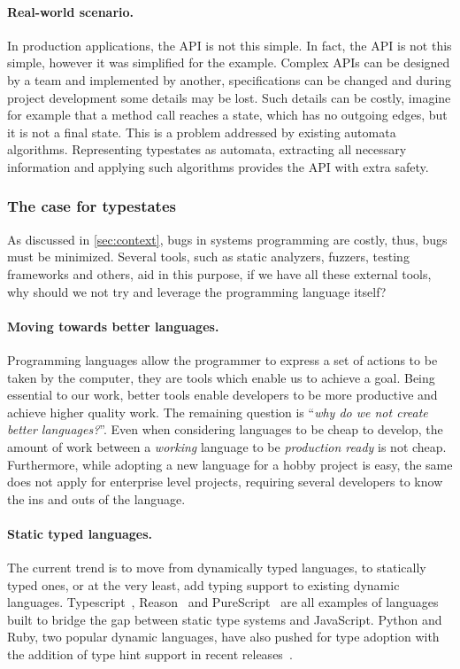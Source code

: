 \paragraph{Real-world scenario.}
In production applications, the API is not this simple.
In fact, the  API is not this simple, however it was simplified for the example.
Complex APIs can be designed by a team and implemented by another,
specifications can be changed and during project development some details may be lost.
Such details can be costly, imagine for example that a method call reaches a state, which has no outgoing edges,
but it is not a final state. This is a problem addressed by existing automata algorithms.
Representing typestates as automata, extracting all necessary information and applying such algorithms provides the API with extra safety.

\subsubsection*{The case for typestates}

As discussed in \autoref{sec:context}, bugs in systems programming are costly,
thus, bugs must be minimized.
Several tools, such as static analyzers, fuzzers, testing frameworks and others,
aid in this purpose, if we have all these external tools,
why should we not try and leverage the programming language itself?

\paragraph{Moving towards better languages.}
Programming languages allow the programmer to express a set of actions to be taken by the computer,
they are tools which enable us to achieve a goal.
Being essential to our work, better tools enable developers to be more productive and achieve higher quality work.
The remaining question is “\emph{why do we not create better languages?}”.
Even when considering languages to be cheap to develop,
the amount of work between a \emph{working} language to be \emph{production ready} is not cheap.
Furthermore, while adopting a new language for a hobby project is easy,
the same does not apply for enterprise level projects,
requiring several developers to know the ins and outs of the language.

\paragraph{Static typed languages.}
The current trend is to move from dynamically typed languages,
to statically typed ones, or at the very least, add typing support to existing dynamic languages.
Typescript~\autocite{typescript},
Reason~\autocite{reason} and
PureScript~\autocite{purescript}
are all examples of languages built to bridge the gap between static type systems and JavaScript.
Python and Ruby, two popular dynamic languages, have also pushed for type adoption
with the addition of type hint support in recent
releases~\autocite{PythonTyping, RubyRBS}.


